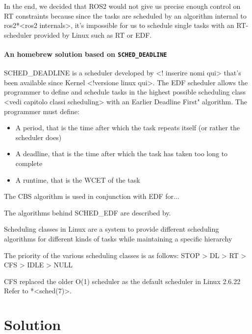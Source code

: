 \documentclass[a4paper,12pt]{report}
\begin{document}
In the end, we decided that ROS2 would not give us precise enough control on RT constraints because since the tasks are scheduled by an algorithm internal to ros2*<ros2 internals>, it's impossible for us to schedule single tasks with an RT-scheduler provided by Linux such as RT or EDF. 

\subsubsection{An homebrew solution based on \texttt{SCHED\_DEADLINE}}

SCHED\_DEADLINE is a scheduler developed by <! inserire nomi qui> that's been available since Kernel <!versione linux qui>. The EDF scheduler allows the programmer to define and schedule tasks in the highest possible scheduling class <vedi capitolo classi scheduling> with an Earlier Deadline First" algorithm. The programmer must define:

\begin{itemize}
    \item A period, that is the time after which the task repeats itself (or rather the scheduler does)
    \item A deadline, that is the time after which the task has taken too long to complete
    \item A runtime, that is the WCET of the task
\end{itemize}

The CBS algorithm is used in conjunction with EDF for...

The algorithms behind SCHED\_EDF are described by.

Scheduling classes in Linux are a system to provide different scheduling algorithms for different kinds of tasks while maintaining a specific hierarchy 

The priority of the various scheduling classes is as follows:
STOP > DL > RT > CFS > IDLE > NULL

CFS replaced the older O(1) scheduler as the default scheduler in Linux 2.6.22 %
Refer to *<sched(7)>.

\newpage
\chapter{Solution}
\end{document}
